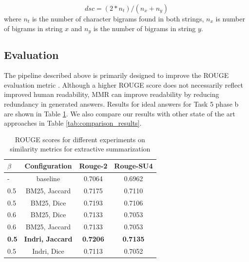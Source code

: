 \begin{equation*}
    dsc = (2 * n_t) / (n_x + n_y)
\end{equation*}
where $n_t$ is the number of character bigrams found in both strings, $n_x$ is number of bigrams in string $x$ and $n_y$ is the number of bigrams in string $y$.
\subsection{\textbf{Evaluation}} The pipeline described above is primarily designed to improve the ROUGE evaluation metric \cite{Rougue}. Although a higher ROUGE score does not necessarily reflect improved human readability, MMR can improve readability by reducing redundancy in generated answers.
Results for ideal answers for Task 5 phase b are shown in Table \ref{tab:rouge_extractive_summarization}. We also compare our results with other state of the art approaches in Table \ref{tab:comparison_results}.

\begin{table}[t!]
    \centering
    \begin{tabular}{|l|c|c|c|}
         \hline
            $\beta$& Configuration & Rouge-2 & Rouge-SU4 \\
        \hline
        \hline
        - & baseline & 0.7064 & 0.6962 \\
        \hline
        0.5 & BM25, Jaccard  & 0.7175 & 0.7110  \\ 
        \hline
        0.5 & BM25, Dice & 0.7193 & 0.7106  \\ 
        \hline
        0.6 & BM25, Dice & 0.7133 & 0.7053  \\ 
        \hline
        0.6 & BM25, Jaccard & 0.7133 & 0.7053  \\
        \hline
        \textbf{0.5} & \textbf{ Indri, Jaccard} & \textbf{0.7206} & \textbf{0.7135}  \\ 
        \hline
         0.5 & Indri, Dice & 0.7113 & 0.7052  \\ 
        \hline
    \end{tabular}
    \caption{ROUGE scores for different experiments on similarity metrics for extractive summarization}
    \label{tab:rouge_extractive_summarization}
\end{table}

